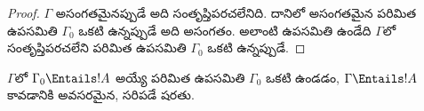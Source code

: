 \documentclass[../../../include/open-logic-section]{subfiles}
\begin{document}
\begin{proof}
$\Gamma$ అసంగతమైనప్పుడే అది సంతృప్తిపరచలేనిది. దానిలో అసంగతమైన పరిమిత ఉపసమితి $\Gamma_0$ ఒకటి ఉన్నప్పుడే అది అసంగతం. అలాంటి ఉపసమితి ఉండేది $\Gamma$లో సంతృప్తిపరచలేని పరిమిత ఉపసమితి $\Gamma_0$ ఒకటి ఉన్నప్పుడే.
\end{proof}

\begin{cor}
$\Gamma$లో $\Gamma_0 \Entails !A$ అయ్యే పరిమిత ఉపసమితి $\Gamma_0$ ఒకటి ఉండడం, $\Gamma \Entails !A$ కావడానికి అవసరమైన, సరిపడే షరతు.
\end{cor}
\end{document}
